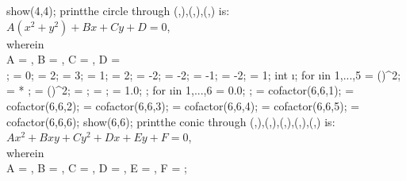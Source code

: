 \documentclass[tikz,border=10pt]{article}
\begin{document}
{  show(4,4);
  print{the circle through (,),(,),(,) is:\\$A(x^2+y^2)+Bx+Cy+D=0$, \\wherein\\ A = \A, B = \B, C = \C, D = \D\\};
   = 0;   = 2;
   = 3;   = 1;
   = 2;   = -2;
   = -2;   = -1;
   = -2;   = 1;
  int \i;
  for \i in {1,...,5}{
     = (\x{\i})^2;
     = \x{\i} * \y{\i};
     = (\y{\i})^2;
     = \x{\i};
     = \y{\i};
     = 1.0;
  };
  for \i in {1,...,6}{
     = 0.0;
  };
  \A = cofactor(6,6,1);
  \B = cofactor(6,6,2);
  \C = cofactor(6,6,3);
  \D = cofactor(6,6,4);
  \E = cofactor(6,6,5);
  \F = cofactor(6,6,6);
  show(6,6);
  print{the conic through (,),(,),(,),(,),(,) is:\\$Ax^2+Bxy+Cy^2+Dx+Ey+F=0$, \\wherein\\ A = \A, B = \B, C = \C, D = \D, E = \E, F = \F};
}
\end{document}

